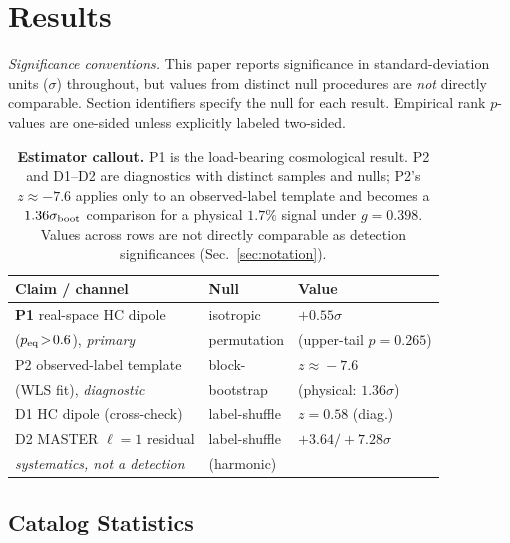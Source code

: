 \documentclass[aps,prd,twocolumn,superscriptaddress,preprintnumbers,nofootinbib,longbibliography,floatfix]{revtex4-2}
\newcommand{\sigmaunit}{\sigma}
\begin{document}
\section{Results}
\label{sec:results}

\textit{Significance conventions.} This paper reports significance in standard-deviation units ($\sigma$) throughout, but values from distinct null procedures are \emph{not} directly comparable. Section identifiers specify the null for each result. Empirical rank $p$-values are one-sided unless explicitly labeled two-sided.

\begin{table}[t]
\caption{\textbf{Estimator callout.} P1 is the load-bearing cosmological result. P2 and D1--D2 are diagnostics with distinct samples and nulls; P2's $z\approx-7.6$ applies only to an observed-label template and becomes a $1.36\sigma_{\rm boot}$ comparison for a physical $1.7\%$ signal under $g=0.398$. Values across rows are not directly comparable as detection significances (Sec.~\ref{sec:notation}).\label{tab:primary_callout}}
\tiny
\begin{ruledtabular}
\begin{tabular}{lll}
\textbf{Claim / channel} & \textbf{Null} & \textbf{Value} \\
\hline
\textbf{P1} real-space HC dipole & isotropic & $+0.55\sigmaunit$ \\
\quad ($p_{\rm eq}\!>\!0.6$), \emph{primary} & \quad permutation & \quad (upper-tail $p\!=\!0.265$) \\
P2 observed-label template & block- & $z\!\approx\!-7.6$ \\
\quad (WLS fit), \emph{diagnostic} & \quad bootstrap & \quad (physical: $1.36\sigma$) \\
\hline
D1 HC dipole (cross-check) & label-shuffle & $z\!=\!0.58$ (diag.) \\
D2 MASTER $\ell\!=\!1$ residual & label-shuffle & $+3.64/+7.28\sigmaunit$ \\
\quad \emph{systematics, not a detection} & \quad (harmonic) & \\
\end{tabular}
\end{ruledtabular}
\end{table}

\subsection{Catalog Statistics}
\label{sec:stats}
\end{document}
